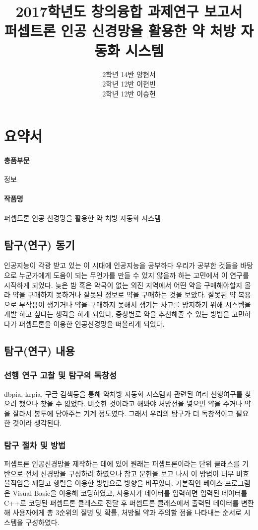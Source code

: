\documentclass{report}
\title{2017학년도 창의융합 과제연구 보고서 \\
\large 퍼셉트론 인공 신경망을 활용한 약 처방 자동화 시스템}
\date{}
\author{
  2학년 14반 양현서\\
  2학년 12반 이현빈\\
  2학년 12반 이승헌
}
\begin{document}
\pagestyle{fancy}
\maketitle
\tableofcontents

\section{요약서}
\paragraph{충품부문}
정보

\paragraph{작품명}
퍼셉트론 인공 신경망을 활용한 약 처방 자동화 시스템


\subsection{탐구(연구) 동기}
인공지능이 각광 받고 있는 이 시대에 인공지능을 공부하다 우리가 공부한 것들을 바탕으로 누군가에게 도움이 되는 무언가를 만들 수 있지 않을까 하는 고민에서 이 연구를 시작하게 되었다. 늦은 밤 혹은 약국이 없는 외진 지역에서 어떤 약을 구매해야할지 몰라 약을 구매하지 못하거나 잘못된 정보로 약을 구매하는 것을 보았다. 잘못된 약 복용으로 부작용이 생기거나 약을 구매하지 못해서 생기는 사고를 방지하기 위해 시스템을 개발 하고 싶다는 생각을 하게 되었다. 증상별로 약을 추천해줄 수 있는 방법을 고민하다가 퍼셉트론을 이용한 인공신경망을 떠올리게 되었다.

\subsection{탐구(연구) 내용}
\subsubsection{선행 연구 고찰 및 탐구의 독창성}
dbpia, krpia, 구글 검색등을 통해 약처방 자동화 시스템과 관련된 여러 선행여구를 찾으려 했으나 찾을 수 없었다. 비슷한 것이라고 해봐야 처방전을 넣으면 약을 주거나 약을 잘라서 봉투에 담아주는 기계 정도였다. 그래서 우리의 탐구가 더 독창적이고 필요한 것이라 생각된다.
\subsubsection{탐구 절차 및 방법}
퍼셉트론 인공신경망을 제작하는 데에 있어 원래는 퍼셉트론이라는 단위 클래스를 기반으로 전체 신경망을 구성하려 하였으나 참고 문헌을 보고 나서 이 방법이 너무 비효율적임을 깨닫고 행렬을 이용한 방법으로 방향을 바꾸었다. 기본적인 베이스 프로그램은 Visual Basic을 이용해 코딩하였고, 사용자가 데이터를 입력하면 입력된 데이터를 C++로 코딩된 퍼셉트론 클래스로 전달 후 퍼셉트론 클래스에서 출력된 데이터를 변환해 사용자에게 총 3순위의 질병 및 확률, 처방될 약과 주의할 점을 나타내는 순서로 시스템을 구성하였다.
\end{document}
